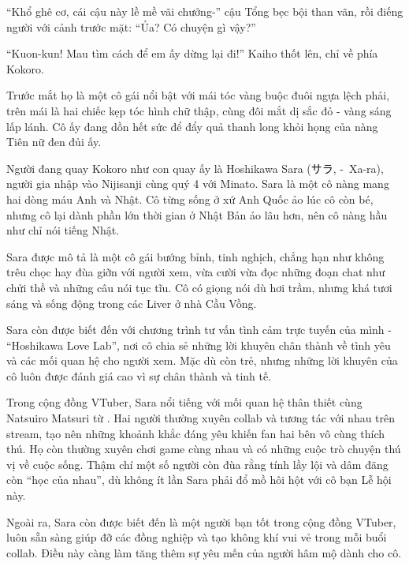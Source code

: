 \documentclass[../main.tex]{subfiles}
\begin{document}
``Khổ ghê cơ, cái cậu này lề mề vãi chưởng-'' cậu Tổng bẹc bội than vãn, rồi điếng người với cảnh trước mặt: ``Ủa? Có chuyện gì vậy?''

``Kuon-kun! Mau tìm cách để em ấy dừng lại đi!'' Kaiho thốt lên, chỉ về phía Kokoro.

Trước mắt họ là một cô gái nổi bật với mái tóc vàng buộc đuôi ngựa lệch phải, trên mái là hai chiếc kẹp tóc hình chữ thập, cùng đôi mắt dị sắc đỏ - vàng sáng lấp lánh. Cô ấy đang dồn hết sức để đẩy quả thanh long khỏi họng của nàng Tiên nữ đen đủi ấy.


\chrint


Người đang quay Kokoro như con quay ấy là Hoshikawa Sara (サラ, -\ Xa-ra), người gia nhập vào Nijisanji cùng quý 4 với Minato. Sara là một cô nàng mang hai dòng máu Anh và Nhật. Cô từng sống ở xứ Anh Quốc ảo lúc cô còn bé, nhưng cô lại dành phần lớn thời gian ở Nhật Bản ảo lâu hơn, nên cô nàng hầu như chỉ nói tiếng Nhật.

Sara được mô tả là một cô gái bướng bỉnh, tinh nghịch, chẳng hạn như không trêu chọc hay đùa giỡn với người xem, vừa cười vừa đọc những đoạn chat như chửi thề và những câu nói tục tĩu. Cô có giọng nói dù hơi trầm, nhưng khá tươi sáng và sống động trong các Liver ở nhà Cầu Vồng.

Sara còn được biết đến với chương trình tư vấn tình cảm trực tuyến của mình - ``Hoshikawa Love Lab'', nơi cô chia sẻ những lời khuyên chân thành về tình yêu và các mối quan hệ cho người xem. Mặc dù còn trẻ, nhưng những lời khuyên của cô luôn được đánh giá cao vì sự chân thành và tinh tế.

Trong cộng đồng VTuber, Sara nổi tiếng với mối quan hệ thân thiết cùng Natsuiro Matsuri từ \hll. Hai người thường xuyên collab và tương tác với nhau trên stream, tạo nên những khoảnh khắc đáng yêu khiến fan hai bên vô cùng thích thú. Họ còn thường xuyên chơi game cùng nhau và có những cuộc trò chuyện thú vị về cuộc sống. Thậm chí một số người còn đùa rằng tính lầy lội và dâm đãng còn ``học của nhau'', dù không ít lần Sara phải đổ mồ hôi hột với cô bạn Lễ hội này.

Ngoài ra, Sara còn được biết đến là một người bạn tốt trong cộng đồng VTuber, luôn sẵn sàng giúp đỡ các đồng nghiệp và tạo không khí vui vẻ trong mỗi buổi collab. Điều này càng làm tăng thêm sự yêu mến của người hâm mộ dành cho cô.
\end{document}
